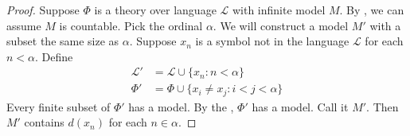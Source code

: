 \message{ !name(truth.tex)}\documentclass{scrbook}
\begin{document}
\begin{proof}
  Suppose $\Phi$ is a theory over language $\mathcal L$ with infinite model $M$. By , we can assume $M$ is countable. Pick the ordinal $\alpha$. We will construct a model $M'$ with a subset the same size as $\alpha$. Suppose $x_n$ is a symbol not in the language $\mathcal L$ for each $n<\alpha$. Define
  \begin{align*}
    \mathcal L' &= \mathcal L \cup \{x_n:n< \alpha\} \\
    \Phi' &= \Phi \cup \{x_i \neq x_j : i<j < \alpha\}
  \end{align*}
  Every finite subset of $\Phi'$ has a model. By the , $\Phi'$ has a model. Call it $M'$. Then $M'$ contains $d(x_n)$ for each $n\in\alpha$.
\end{proof}
\printbibliography
\end{document}
